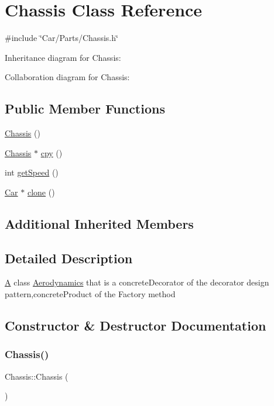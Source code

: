\hypertarget{classChassis}{}\section{Chassis Class Reference}
\label{classChassis}


{\ttfamily \#include \char`\"{}Car/\+Parts/\+Chassis.\+h\char`\"{}}



Inheritance diagram for Chassis\+:


Collaboration diagram for Chassis\+:
\subsection*{Public Member Functions}
\begin{DoxyCompactItemize}
\item 
\hyperlink{classChassis_abff4a95e18eea726bccbb647939b2141}{Chassis} ()
\item 
\hyperlink{classChassis}{Chassis} $\ast$ \hyperlink{classChassis_a75bfca11337766c0dda9544f27987d18}{cpy} ()
\item 
int \hyperlink{classChassis_a095c63aa079ebd8d7fc04f238fd1e56c}{get\+Speed} ()
\item 
\hyperlink{classCar}{Car} $\ast$ \hyperlink{classChassis_a2700ee5437760643c7cad46e077dcbcd}{clone} ()
\end{DoxyCompactItemize}
\subsection*{Additional Inherited Members}


\subsection{Detailed Description}
\hyperlink{classA}{A} class \hyperlink{classAerodynamics}{Aerodynamics} that is a concrete\+Decorator of the decorator design pattern,concrete\+Product of the Factory method 

\subsection{Constructor \& Destructor Documentation}
\mbox{\label{classChassis_abff4a95e18eea726bccbb647939b2141}} 
\subsubsection{\texorpdfstring{Chassis()}{Chassis()}}
{\footnotesize\ttfamily Chassis\+::\+Chassis (\begin{DoxyParamCaption}{ }\end{DoxyParamCaption})}

